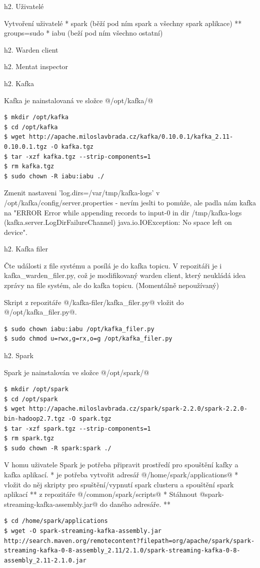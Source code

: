 \documentclass[a4paper]{article} %
\begin{document}
h2. Uživatelé

Vytvoření uživatelé
* spark (běží pod ním spark a všechny spark aplikace)
** groups=sudo
* iabu (beží pod ním všechno ostatní)

h2. Warden client

h2. Mentat inspector

h2. Kafka

Kafka je nainstalovaná ve složce @/opt/kafka/@

\begin{lstlisting}[]
$ mkdir /opt/kafka
$ cd /opt/kafka
$ wget http://apache.miloslavbrada.cz/kafka/0.10.0.1/kafka_2.11-0.10.0.1.tgz -O kafka.tgz
$ tar -xzf kafka.tgz --strip-components=1
$ rm kafka.tgz
$ sudo chown -R iabu:iabu ./
\end{lstlisting}

Zmenit nastaveni 'log.dirs=/var/tmp/kafka-logs' v /opt/kafka/config/server.properties - nevím jeslti to pomůže, ale padla nám kafka na "ERROR Error while appending records to input-0 in dir /tmp/kafka-logs (kafka.server.LogDirFailureChannel) java.io.IOException: No space left on device".

h2. Kafka filer

Čte události z file systému a posílá je do kafka topicu. 
V repozitáři je i kafka\_warden\_filer.py, což je modifikovaný warden client, který neukládá idea zprávy na file systém, ale do kafka topicu. (Momentálně nepoužívaný)

Skript z repozitáře @/kafka-filer/kafka\_filer.py@ vložit do @/opt/kafka\_filer.py@.

\begin{lstlisting}[]
$ sudo chown iabu:iabu /opt/kafka_filer.py
$ sudo chmod u=rwx,g=rx,o=g /opt/kafka_filer.py
\end{lstlisting}

h2. Spark

Spark je nainstalován ve složce @/opt/spark/@

\begin{lstlisting}[]
$ mkdir /opt/spark
$ cd /opt/spark
$ wget http://apache.miloslavbrada.cz/spark/spark-2.2.0/spark-2.2.0-bin-hadoop2.7.tgz -O spark.tgz
$ tar -xzf spark.tgz --strip-components=1
$ rm spark.tgz
$ sudo chown -R spark:spark ./
\end{lstlisting}

V homu uživatele Spark je potřeba připravit prostředí pro spouštění kafky a kafka aplikací.
* je potřeba vytvořit adresář @/home/spark/applications@
* vložit do něj skripty pro spuštění/vypnutí spark clusteru a spouštění spark aplikací
** z repozitáře @/common/spark/scripts@
* Stáhnout @spark-streaming-kafka-assembly.jar@ do daného adresáře.
** \begin{lstlisting}[]
$ cd /home/spark/applications
$ wget -O spark-streaming-kafka-assembly.jar http://search.maven.org/remotecontent?filepath=org/apache/spark/spark-streaming-kafka-0-8-assembly_2.11/2.1.0/spark-streaming-kafka-0-8-assembly_2.11-2.1.0.jar
\end{lstlisting}
\end{document}
